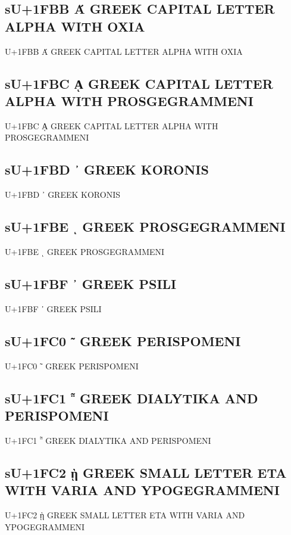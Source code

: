 \subsection{sU+1FBB Ά GREEK CAPITAL LETTER ALPHA WITH OXIA}

U+1FBB Ά GREEK CAPITAL LETTER ALPHA WITH OXIA

\subsection{sU+1FBC ᾼ GREEK CAPITAL LETTER ALPHA WITH PROSGEGRAMMENI}

U+1FBC ᾼ GREEK CAPITAL LETTER ALPHA WITH PROSGEGRAMMENI

\subsection{sU+1FBD ᾽ GREEK KORONIS}

U+1FBD ᾽ GREEK KORONIS

\subsection{sU+1FBE ι GREEK PROSGEGRAMMENI}

U+1FBE ι GREEK PROSGEGRAMMENI

\subsection{sU+1FBF ᾿ GREEK PSILI}

U+1FBF ᾿ GREEK PSILI

\subsection{sU+1FC0 ῀ GREEK PERISPOMENI}

U+1FC0 ῀ GREEK PERISPOMENI

\subsection{sU+1FC1 ῁ GREEK DIALYTIKA AND PERISPOMENI}

U+1FC1 ῁ GREEK DIALYTIKA AND PERISPOMENI

\subsection{sU+1FC2 ῂ GREEK SMALL LETTER ETA WITH VARIA AND YPOGEGRAMMENI}

U+1FC2 ῂ GREEK SMALL LETTER ETA WITH VARIA AND YPOGEGRAMMENI

